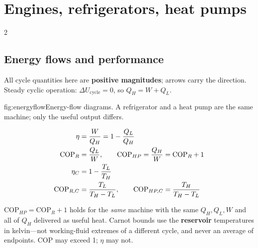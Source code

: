 \section{Engines, refrigerators, heat pumps}\label{sec:cycles}
\begin{multicols}{2}
\subsection{Energy flows and performance}\label{sec:cycleflows}
\CORE{} All cycle quantities here are \textbf{positive magnitudes}; arrows carry the direction. Steady cyclic operation: $\Delta U_{\text{cycle}}=0$, so $Q_H=W+Q_L$.

\begin{reffig}{fig:energyflow}{Energy-flow diagrams. A refrigerator and a heat pump are the same machine; only the useful output differs.}
\end{reffig}

\begin{formulabox}
\vspace{-6pt}
\begin{align}
\eta &= \frac{W}{Q_H}=1-\frac{Q_L}{Q_H} \label{F:cycle:eta}\\
\mathrm{COP}_R &= \frac{Q_L}{W},\qquad \mathrm{COP}_{HP}=\frac{Q_H}{W}=\mathrm{COP}_R+1 \label{F:cycle:cop}\\
\eta_C &= 1-\frac{T_L}{T_H} \label{F:cycle:carnot}\\
\mathrm{COP}_{R,C} &= \frac{T_L}{T_H-T_L},\qquad \mathrm{COP}_{HP,C}=\frac{T_H}{T_H-T_L} \notag
\end{align}
\end{formulabox}
$\mathrm{COP}_{HP}=\mathrm{COP}_R+1$ holds for the \emph{same} machine with the same $Q_H,Q_L,W$ and all of $Q_H$ delivered as useful heat. Carnot bounds use the \textbf{reservoir} temperatures in kelvin---not working-fluid extremes of a different cycle, and never an average of endpoints. COP may exceed 1; $\eta$ may not.


\end{multicols}
